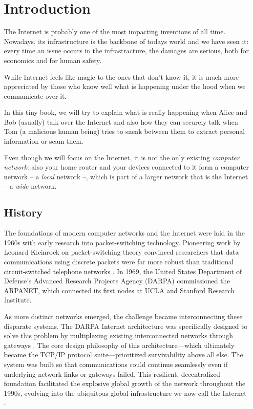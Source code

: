 \chapter{Introduction}
The Internet is probably one of the most impacting inventions of all time. Nowadays, its infrastructure is the backbone of todays world and we have seen it: every time an issue occurs in the infrastracture, the damages are serious, both for economics and for human safety.

While Internet feels like magic to the ones that don't know it, it is much more appreciated by those who know well what is happening under the hood when we communicate over it.

In this tiny book, we will try to explain what is really happening when Alice and Bob (usually) talk over the Internet and also how they can securely talk when Tom (a malicious human being) tries to sneak between them to extract personal information or scam them.

Even though we will focus on the Internet, it is not the only existing \emph{computer network}: also your home router and your devices connected to it form a computer network -- a \emph{local} network --, which is part of a larger network that is the Internet -- a \emph{wide} network.

\section{History}
The foundations of modern computer networks and the Internet were laid in the 1960s with early research into packet-switching technology. Pioneering work by Leonard Kleinrock on packet-switching theory convinced researchers that data communications using discrete packets were far more robust than traditional circuit-switched telephone networks \cite{leiner1997past}. In 1969, the United States Department of Defense's Advanced Research Projects Agency (DARPA) commissioned the ARPANET, which connected its first nodes at UCLA and Stanford Research Institute.

As more distinct networks emerged, the challenge became interconnecting these disparate systems. The DARPA Internet architecture was specifically designed to solve this problem by multiplexing existing interconnected networks through gateways \cite{clark1988design}. The core design philosophy of this architecture—which ultimately became the TCP/IP protocol suite—prioritized survivability above all else. The system was built so that communications could continue seamlessly even if underlying network links or gateways failed. This resilient, decentralized foundation facilitated the explosive global growth of the network throughout the 1990s, evolving into the ubiquitous global infrastructure we now call the Internet \cite{leiner1997past}.

